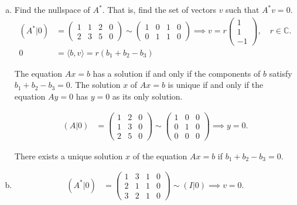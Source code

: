 \documentclass{article}
\begin{document}
\begin{enumerate}[a.]
\item

Find the nullspace of $A^*$. That is, find the set of vectors $v$ such that $A^*v = 0$. 
\begin{align*}
(A^* \vert 0) &= \begin{pmatrix}
1 & 1 & 2 & 0 \\ 2 & 3 & 5 & 0
\end{pmatrix}
\sim 
\begin{pmatrix}
1 & 0 & 1 & 0 \\ 
0 & 1 & 1 & 0
\end{pmatrix}
\implies v = r\begin{pmatrix}
1 \\ 1 \\ -1
\end{pmatrix}, \quad r \in \mathbb{C}. \\
0 &= \langle b, v \rangle = r(b_1 + b_2 - b_3)
\end{align*}

The equation $Ax = b$ has a solution if and only if the components of $b$ satisfy $b_1 + b_2 - b_3 = 0$. The solution $x$ of $Ax =b$ is unique if and only if the equation $Ay = 0$ has $y = 0$ as its only solution. 

\begin{align*}
(A \vert 0) &= \begin{pmatrix}
1 & 2 & 0 \\ 1 & 3  & 0\\ 2 & 5 & 0
\end{pmatrix}
\sim 
\begin{pmatrix}
1 & 0 & 0 \\ 0 & 1 & 0 \\ 0 & 0 & 0
\end{pmatrix} \implies y = 0.
\end{align*}

There exists a unique solution $x$ of the equation $Ax = b$ if $b_1 + b_2 - b_3 = 0$. 

\item

\begin{align*}
(A^* \vert 0) &= \begin{pmatrix}
1 & 3 & 1 & 0 \\ 2 & 1 & 1 & 0 \\ 3 & 2 & 1 & 0
\end{pmatrix}
\sim
(I \vert 0) \implies v = 0.
\end{align*}


\end{enumerate}
\end{document}
